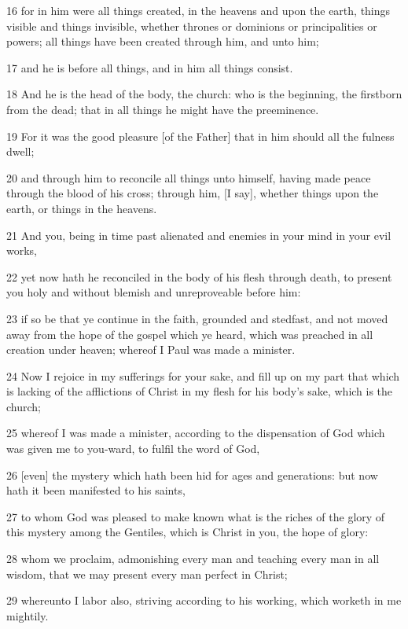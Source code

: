 \par 16 for in him were all things created, in the heavens and upon the earth, things visible and things invisible, whether thrones or dominions or principalities or powers; all things have been created through him, and unto him;
\par 17 and he is before all things, and in him all things consist.
\par 18 And he is the head of the body, the church: who is the beginning, the firstborn from the dead; that in all things he might have the preeminence.
\par 19 For it was the good pleasure [of the Father] that in him should all the fulness dwell;
\par 20 and through him to reconcile all things unto himself, having made peace through the blood of his cross; through him, [I say], whether things upon the earth, or things in the heavens.
\par 21 And you, being in time past alienated and enemies in your mind in your evil works,
\par 22 yet now hath he reconciled in the body of his flesh through death, to present you holy and without blemish and unreproveable before him:
\par 23 if so be that ye continue in the faith, grounded and stedfast, and not moved away from the hope of the gospel which ye heard, which was preached in all creation under heaven; whereof I Paul was made a minister.
\par 24 Now I rejoice in my sufferings for your sake, and fill up on my part that which is lacking of the afflictions of Christ in my flesh for his body's sake, which is the church;
\par 25 whereof I was made a minister, according to the dispensation of God which was given me to you-ward, to fulfil the word of God,
\par 26 [even] the mystery which hath been hid for ages and generations: but now hath it been manifested to his saints,
\par 27 to whom God was pleased to make known what is the riches of the glory of this mystery among the Gentiles, which is Christ in you, the hope of glory:
\par 28 whom we proclaim, admonishing every man and teaching every man in all wisdom, that we may present every man perfect in Christ;
\par 29 whereunto I labor also, striving according to his working, which worketh in me mightily.

